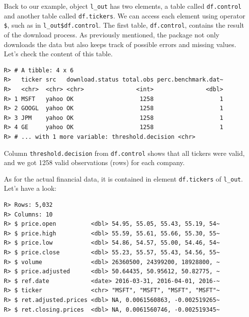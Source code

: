 \documentclass[
  12pt,
]{book}
\newenvironment{Shaded}{\begin{snugshade}}{\end{snugshade}}
\newcommand{\CommentTok}[1]{\textcolor[rgb]{0.37,0.37,0.37}{\textit{#1}}}
\newcommand{\KeywordTok}[1]{\textcolor[rgb]{0.27,0.27,0.27}{\textbf{#1}}}
\newcommand{\NormalTok}[1]{#1}
\newcommand{\OperatorTok}[1]{\textcolor[rgb]{0.43,0.43,0.43}{\textbf{#1}}}
\begin{document}
Back to our example, object \texttt{l\_out} has two elements, a table called \texttt{df.control} and another table called \texttt{df.tickers}. We can access each element using operator \texttt{\$}, such as in \texttt{l\_out\$df.control}. The first table, \texttt{df.control}, contains the result of the download process. As previously mentioned, the package not only downloads the data but also keeps track of possible errors and missing values. Let's check the content of this table.

\begin{Shaded}
\end{Shaded}

\begin{verbatim}
R> # A tibble: 4 x 6
R>   ticker src   download.status total.obs perc.benchmark.dat~
R>   <chr>  <chr> <chr>               <int>               <dbl>
R> 1 MSFT   yahoo OK                   1258                   1
R> 2 GOOGL  yahoo OK                   1258                   1
R> 3 JPM    yahoo OK                   1258                   1
R> 4 GE     yahoo OK                   1258                   1
R> # ... with 1 more variable: threshold.decision <chr>
\end{verbatim}

Column \texttt{threshold.decision} from \texttt{df.control} shows that all tickers were valid, and we got 1258 valid observations (rows) for each company.

As for the actual financial data, it is contained in element \texttt{df.tickers} of \texttt{l\_out}. Let's have a look:

\begin{Shaded}
\end{Shaded}

\begin{verbatim}
R> Rows: 5,032
R> Columns: 10
R> $ price.open          <dbl> 54.95, 55.05, 55.43, 55.19, 54~
R> $ price.high          <dbl> 55.59, 55.61, 55.66, 55.30, 55~
R> $ price.low           <dbl> 54.86, 54.57, 55.00, 54.46, 54~
R> $ price.close         <dbl> 55.23, 55.57, 55.43, 54.56, 55~
R> $ volume              <dbl> 26360500, 24399200, 18928800, ~
R> $ price.adjusted      <dbl> 50.64435, 50.95612, 50.82775, ~
R> $ ref.date            <date> 2016-03-31, 2016-04-01, 2016-~
R> $ ticker              <chr> "MSFT", "MSFT", "MSFT", "MSFT"~
R> $ ret.adjusted.prices <dbl> NA, 0.0061560863, -0.002519265~
R> $ ret.closing.prices  <dbl> NA, 0.0061560746, -0.002519345~
\end{verbatim}
\end{document}
